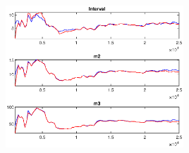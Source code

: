\documentclass[11pt,preprint, authoryear]{elsarticle}
\let\origfigure\figure
\let\endorigfigure\endfigure
\renewenvironment{figure}[1][2] {
    \expandafter\origfigure\expandafter[H]
} {
    \endorigfigure
}
\numberwithin{equation}{section}
\numberwithin{figure}{section}
\numberwithin{table}{section}
\begin{document}
\begin{figure}
\centering
\includegraphics[width = 0.5\textwidth]{code/mcmc_m}
\caption{MCMC multivariate diagnostics of structural parameters for extended sample under the Taylor rule (\ref{s1}) [@brooks1998]. The first plot shows the convergence diagnostics for the 80 per cent interval. The second and third plots shows the estimates of the second and third central moments (m2 and m3), respectively. The red line shows the 80 per cent quantile range based on the 25 000 pooled draws from all sequences and the blue line shows the mean interval range based on the draws of the individual sequences.}
\label{mcmcm2}
\end{figure}
\end{document}
